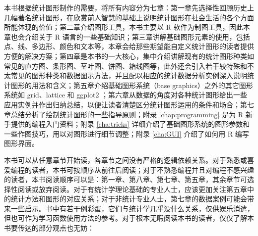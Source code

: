 \documentclass[
  b5paper,
  UTF8,twoside]{book}
\begin{document}
本书根据统计图形制作的需要，将所有内容分为七章：第一章先选择性回顾历史上几幅著名统计图形，在欣赏前人智慧的基础上说明统计图形在社会生活的各个方面所能体现的价值；第二章介绍图形工具，本书主要以 R 软件为制图工具，因此本章也会介绍关于 R 语言的一些基础知识；第三章讲解基础图形元素的使用，包括点、线、多边形、颜色和文本等，本章会给那些期望能自定义统计图形的读者提供方便的解决方案；第四章是本书的一大核心，集中介绍讲解现有的统计图形种类如常见的直方图、条形图、茎叶图、饼图、箱线图等，此外还会引入若干较特殊和不太常见的图形种类和数据图示方法，并且配以相应的统计数据分析实例深入说明统计图形的用法和含义；第五章介绍基础图形系统（base graphics）之外的其它图形系统如 grid、lattice 和 ggplot2 ；第六章从数据的角度对各种统计图形给出一些应用实例并作出归纳总结，以便让读者清楚区分统计图形运用的条件和场合；第七章总结分析了绘制统计图形的一些指导原则；附录 \ref{chap:programming} 是为 R 新手提供的编程入门资料；附录 \ref{cha:tricks} 详细介绍了基础图形系统的图形参数和一些作图技巧，用以对图形进行细节调整；附录 \ref{cha:GUI} 介绍了如何用 R 编写图形界面。

本书可以从任意章节开始读，各章节之间没有严格的逻辑依赖关系。对于熟悉或喜爱编程的读者，本书可按顺序从前往后阅读；对于不熟悉编程并且对编程不感兴趣的读者，本书阅读顺序可以是：第一章、第八章、第七章、第五章，其余章节可选择性阅读或放弃阅读。对于有统计学理论基础的专业人士，应该更加关注第五章中的统计方法和图形的对应关系；对于非统计专业人士，第七章的数据案例可能会带来一些启示。书中有若干例彩蛋，它们与统计学几乎没什么关系，仅供娱乐消遣，但也可作为学习函数使用方法的参考。对于根本无暇阅读本书的读者，仅仅了解本书要传达的部分观点也无妨：
\end{document}
